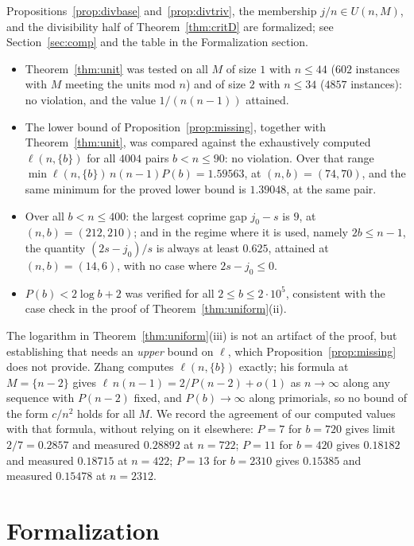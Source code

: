 \documentclass[11pt]{amsart}
\theoremstyle{plain}
\theoremstyle{definition}
\begin{document}
Propositions~\ref{prop:divbase} and~\ref{prop:divtriv}, the membership $j/n\in U(n,M)$, and the
divisibility half of Theorem~\ref{thm:critD} are formalized; see Section~\ref{sec:comp} and the
table in the Formalization section.

\begin{itemize}
\item Theorem~\ref{thm:unit} was tested on all $M$ of size $1$ with $n\le 44$ ($602$ instances with
$M$ meeting the units mod $n$) and of size $2$ with $n\le34$ ($4857$ instances): no violation, and
the value $1/(n(n-1))$ attained.
\item The lower bound of Proposition~\ref{prop:missing}, together with
Theorem~\ref{thm:unit}, was compared against the exhaustively computed $\ell(n,\{b\})$ for all
$4004$ pairs $b<n\le 90$: no violation. Over that range
$\min \ell(n,\{b\})\,n(n-1)P(b)=1.59563$, at $(n,b)=(74,70)$, and the same minimum for the proved
lower bound is $1.39048$, at the same pair.
\item Over all $b<n\le400$: the largest coprime gap $j_0-s$ is $9$, at $(n,b)=(212,210)$; and in
the regime where it is used, namely $2b\le n-1$, the quantity $(2s-j_0)/s$ is always at least
$0.625$, attained at $(n,b)=(14,6)$, with no case where $2s-j_0\le0$.
\item $P(b)<2\log b+2$ was verified for all $2\le b\le 2\cdot10^{5}$, consistent with the case check
in the proof of Theorem~\ref{thm:uniform}(ii).
\end{itemize}

The logarithm in Theorem~\ref{thm:uniform}(iii) is not an artifact of the proof, but establishing
that needs an \emph{upper} bound on $\ell$, which Proposition~\ref{prop:missing} does not provide.
Zhang \cite[Thm.~1.4]{zhang} computes $\ell(n,\{b\})$ exactly; his formula at $M=\{n-2\}$ gives
$\ell\,n(n-1)=2/P(n-2)+o(1)$ as $n\to\infty$ along any sequence with $P(n-2)$ fixed, and
$P(b)\to\infty$ along primorials, so no bound of the form $c/n^{2}$ holds for all $M$. We record the
agreement of our computed values with that formula, without relying on it elsewhere: $P=7$ for $b=720$
gives limit $2/7=0.2857$ and measured $0.28892$ at $n=722$; $P=11$ for $b=420$ gives $0.18182$ and
measured $0.18715$ at $n=422$; $P=13$ for $b=2310$ gives $0.15385$ and measured $0.15478$ at
$n=2312$.

\section{Formalization}
\end{document}
